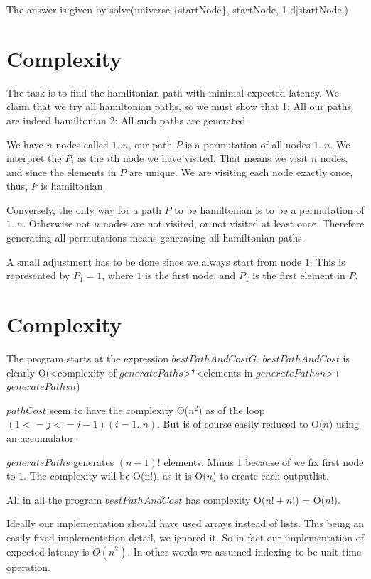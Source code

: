 \documentclass[a4paper,11pt]{article}
\begin{document}
The answer is given by
solve(universe \setminus \{startNode\}, startNode, 1-d[startNode])

\section{Complexity}
The task is to find the hamlitonian path with minimal expected latency.
We claim that we try all hamiltonian paths, so we must show that
1: All our paths are indeed hamiltonian
2: All such paths are generated

We have $n$ nodes called $1..n$, our path $P$ is a permutation of all nodes $1..n$.
We interpret the $P_i$ as the $i$th node we have visited.
That means we visit $n$ nodes, and since the elements in $P$ are unique.
We are visiting each node exactly once, thus, $P$ is hamiltonian.

Conversely, the only way for a path $P$ to be hamiltonian is to be a permutation of $1..n$.
Otherwise not $n$ nodes are not visited, or not visited at least once.
Therefore generating all permutations means generating all hamiltonian paths.

A small adjustment has to be done since we always start from node $1$.
This is represented by $P_1 = 1$, where $1$ is the first node, and $P_1$ is
the first element in $P$.

\section{Complexity}
The program starts at the expression $bestPathAndCost G$.
$bestPathAndCost$ is clearly
O(<complexity of $generatePaths$>$*$<elements in $generatePaths n$>$+$ $generatePaths n$)

$pathCost$ seem to have the complexity O($n^2$) as of the loop $(1 <= j <= i-1) (i = 1..n)$.
But is of course easily reduced to O($n$) using an accumulator.

$generatePaths$ generates $(n-1)!$ elements. Minus 1 because of we fix first node to $1$. 
The complexity will be O(n!), as it is O($n$) to create each outputlist.

All in all the program $bestPathAndCost$ has complexity O($n!+n!$) = O($n!$).

Ideally our implementation should have used arrays instead of lists.
This being an easily fixed implementation detail, we ignored it.
So in fact our implementation of expected latency is $O(n^2)$.
In other words we assumed indexing to be unit time operation. 
\end{document}
